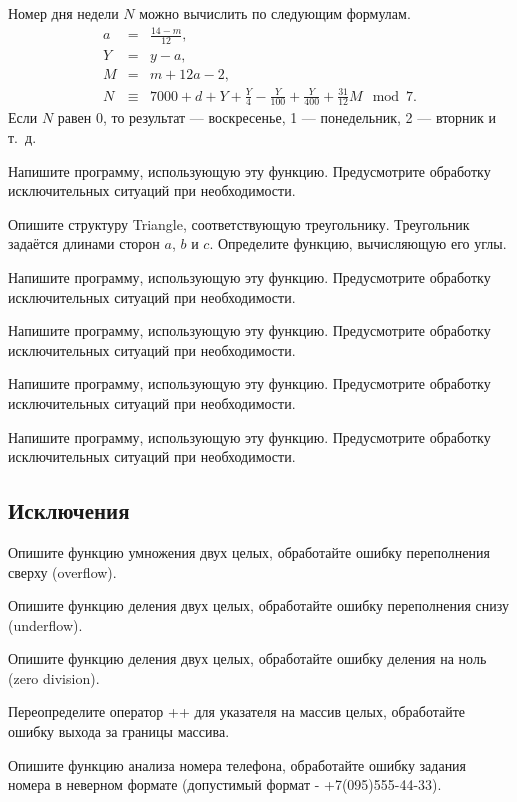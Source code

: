 Номер дня недели $N$ можно вычислить по следующим формулам.
\begin{eqnarray*}
a &=& \frac{14 - m}{12},\\
Y &=& y - a,\\
M &=& m + 12a - 2,\\
N &\equiv& 7000 + d + Y + \frac{Y}{4} - \frac{Y}{100} + \frac{Y}{400} + \frac{31}{12}M \mod 7.
\end{eqnarray*}
Если $N$ равен 0, то результат — воскресенье, 1 — понедельник, 2 —
вторник и т.~д.

Напишите программу, использующую эту функцию. Предусмотрите обработку
исключительных ситуаций при необходимости.

\task Опишите структуру Triangle, соответствующую
треугольнику. Треугольник задаётся длинами сторон $a$, $b$ и $c$.
Определите функцию, вычисляющую его углы.

Напишите программу, использующую эту функцию. Предусмотрите обработку
исключительных ситуаций при необходимости.

\task %

Напишите программу, использующую эту функцию. Предусмотрите обработку
исключительных ситуаций при необходимости.

\task %

Напишите программу, использующую эту функцию. Предусмотрите обработку
исключительных ситуаций при необходимости.

\task 

Напишите программу, использующую эту функцию. Предусмотрите обработку
исключительных ситуаций при необходимости.


\subsection{Исключения}

\task Опишите функцию умножения двух целых, обработайте ошибку переполнения сверху (overflow).

\task Опишите функцию деления двух целых, обработайте ошибку переполнения снизу (underflow).

\task Опишите функцию деления двух целых, обработайте ошибку деления на ноль (zero division).

\task Переопределите оператор ++ для указателя на массив целых, обработайте ошибку выхода за границы массива.

\task Опишите функцию анализа номера телефона, обработайте ошибку задания номера в неверном формате (допустимый формат - +7(095)555-44-33).

